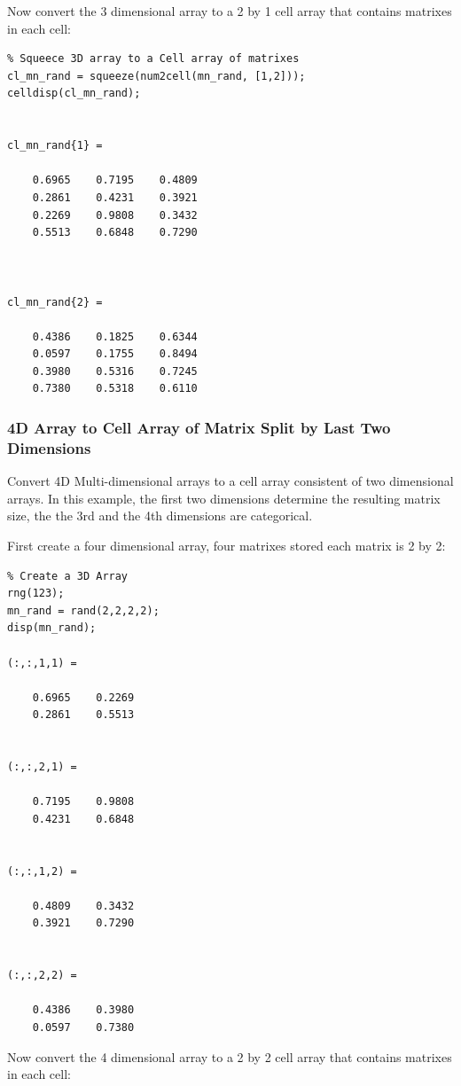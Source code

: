 \documentclass[
]{book}
\begin{document}
Now convert the 3 dimensional array to a 2 by 1 cell array that contains
matrixes in each cell:

\begin{verbatim}
% Squeece 3D array to a Cell array of matrixes
cl_mn_rand = squeeze(num2cell(mn_rand, [1,2]));
celldisp(cl_mn_rand);


cl_mn_rand{1} =
 
    0.6965    0.7195    0.4809
    0.2861    0.4231    0.3921
    0.2269    0.9808    0.3432
    0.5513    0.6848    0.7290



cl_mn_rand{2} =
 
    0.4386    0.1825    0.6344
    0.0597    0.1755    0.8494
    0.3980    0.5316    0.7245
    0.7380    0.5318    0.6110
\end{verbatim}

\hypertarget{d-array-to-cell-array-of-matrix-split-by-last-two-dimensions}{%
\subsubsection{4D Array to Cell Array of Matrix Split by Last Two Dimensions}\label{d-array-to-cell-array-of-matrix-split-by-last-two-dimensions}}

Convert 4D Multi-dimensional arrays to a cell array consistent of two
dimensional arrays. In this example, the first two dimensions determine
the resulting matrix size, the the 3rd and the 4th dimensions are
categorical.

First create a four dimensional array, four matrixes stored each matrix
is 2 by 2:

\begin{verbatim}
% Create a 3D Array
rng(123);
mn_rand = rand(2,2,2,2);
disp(mn_rand);

(:,:,1,1) =

    0.6965    0.2269
    0.2861    0.5513


(:,:,2,1) =

    0.7195    0.9808
    0.4231    0.6848


(:,:,1,2) =

    0.4809    0.3432
    0.3921    0.7290


(:,:,2,2) =

    0.4386    0.3980
    0.0597    0.7380
\end{verbatim}

Now convert the 4 dimensional array to a 2 by 2 cell array that contains
matrixes in each cell:
\end{document}
